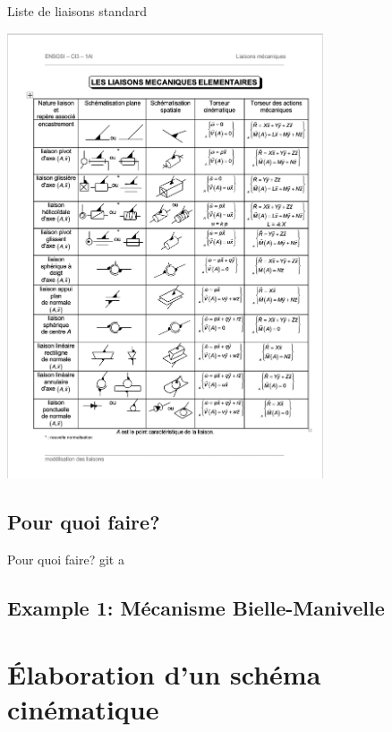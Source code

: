 \documentclass[
  ignorenonframetext,
  aspectratio=169,
  c]{beamer}
\begin{document}
\begin{frame}{Liste de liaisons standard}
\label{liste-de-liaisons-standard}
\begin{center}
\includegraphics[width=0.7\textwidth,height=\textheight]{CM3/Liaisons.png}
\end{center}
\end{frame}

\subsection{Pour quoi faire?}\label{pour-quoi-faire}

\begin{frame}{Pour quoi faire?}
git a
\end{frame}

\subsection{Example 1: Mécanisme
Bielle-Manivelle}\label{example-1-muxe9canisme-bielle-manivelle}

\section{Élaboration d'un schéma
cinématique}\label{uxe9laboration-dun-schuxe9ma-cinuxe9matique}
\end{document}
